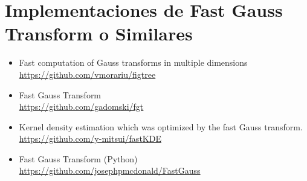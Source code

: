 \documentclass[letter, 10pt]{article}
\begin{document}
\section{Implementaciones de Fast Gauss Transform o Similares}

\begin{itemize}
\item Fast computation of Gauss transforms in multiple dimensions \\ \url{https://github.com/vmorariu/figtree}
\item Fast Gauss Transform  \\ \url{https://github.com/gadomski/fgt}
\item Kernel density estimation which was optimized by the fast Gauss transform. \\ \url{https://github.com/y-mitsui/fastKDE}

\item Fast Gauss Transform (Python) \\ \url{https://github.com/josephpmcdonald/FastGauss}
\end{itemize}




\end{document}
